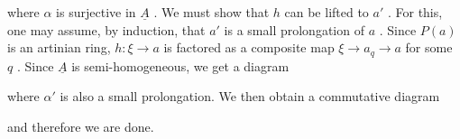\begin{center}
\end{center}
where  $\alpha$  is surjective in  $\underline{A}$  . We must show that  $h$  can be lifted to  $a'$  . For this, one may assume, by induction, that  $a'$  is a small prolongation of  $a$  . Since  $P(a)$  is an artinian ring,  $h : \xi \to a$  is factored as a composite map $\xi \to a_q \longrightarrow a$  for some  $q$  . Since  $\underline{A}$  is semi-homogeneous, we get a diagram

\begin{center}
\end{center}
where  $\alpha'$  is also a small prolongation. We then obtain a commutative diagram

\begin{center}
\end{center}
and therefore we are done.

